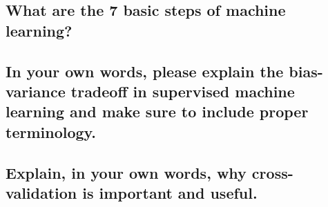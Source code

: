 \documentclass[
  12pt,
]{article}
\begin{document}
\hypertarget{what-are-the-7-basic-steps-of-machine-learning}{%
\subsection{What are the 7 basic steps of machine
learning?}\label{what-are-the-7-basic-steps-of-machine-learning}}

\hypertarget{in-your-own-words-please-explain-the-bias-variance-tradeoff-in-supervised-machine-learning-and-make-sure-to-include-proper-terminology.}{%
\subsection{In your own words, please explain the bias-variance tradeoff
in supervised machine learning and make sure to include proper
terminology.}\label{in-your-own-words-please-explain-the-bias-variance-tradeoff-in-supervised-machine-learning-and-make-sure-to-include-proper-terminology.}}

\hypertarget{explain-in-your-own-words-why-cross-validation-is-important-and-useful.}{%
\subsection{Explain, in your own words, why cross-validation is
important and
useful.}\label{explain-in-your-own-words-why-cross-validation-is-important-and-useful.}}
\end{document}
